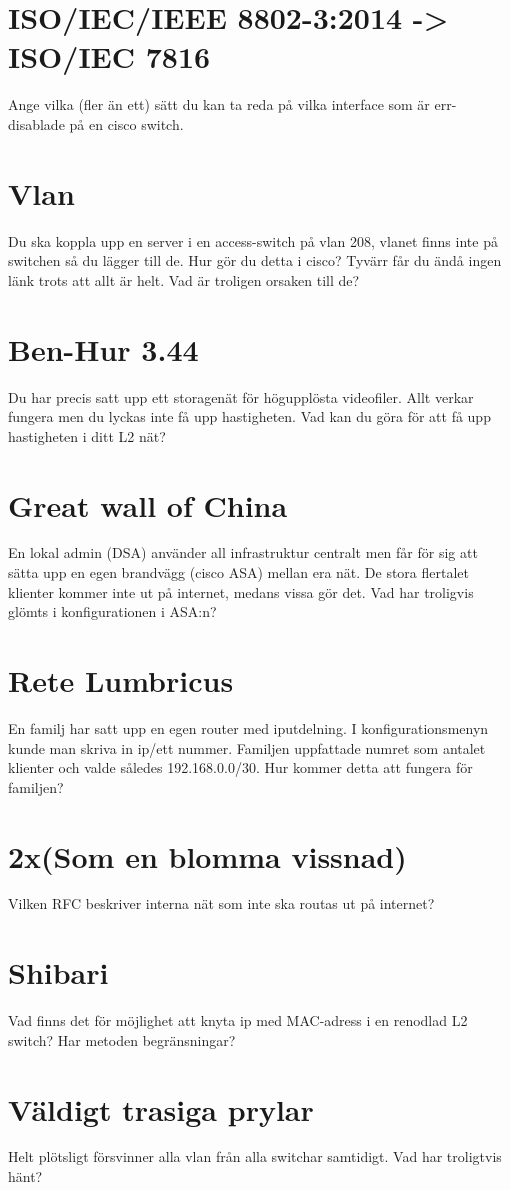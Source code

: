 \documentclass[a4paper]{report}
\begin{document}
\section{ISO/IEC/IEEE 8802-3:2014 -> ISO/IEC 7816}
Ange vilka (fler än ett) sätt du kan ta reda på vilka interface som är err-disablade på en cisco switch.

\section{Vlan}
Du ska koppla upp en server i en access-switch på vlan 208, vlanet finns inte på switchen så du lägger till de. Hur gör du detta i cisco? 
Tyvärr får du ändå ingen länk trots att allt är helt. Vad är troligen orsaken till de? 

\section{Ben-Hur 3.44}
Du har precis satt upp ett storagenät för högupplösta videofiler. Allt verkar fungera men du lyckas inte få upp hastigheten. Vad kan du göra för att få upp hastigheten i ditt L2 nät?

\section{Great wall of China}
En lokal admin (DSA) använder all infrastruktur centralt men får för sig att sätta upp en egen brandvägg (cisco ASA) mellan era nät. De stora flertalet klienter kommer inte ut på internet, medans vissa gör det. Vad har troligvis glömts i konfigurationen i ASA:n? 

\section{Rete Lumbricus}
En familj har satt upp en egen router med iputdelning. I konfigurationsmenyn kunde man skriva in ip/ett nummer. Familjen uppfattade numret som antalet klienter och valde således 192.168.0.0/30. Hur kommer detta att fungera för familjen?

\section{2x(Som en blomma vissnad)}
Vilken RFC beskriver interna nät som inte ska routas ut på internet? 

\section{Shibari}
Vad finns det för möjlighet att knyta ip med MAC-adress i en renodlad L2 switch? Har metoden begränsningar?

\section{Väldigt trasiga prylar}
Helt plötsligt försvinner alla vlan från alla switchar samtidigt. Vad har troligtvis hänt?
\end{document}

